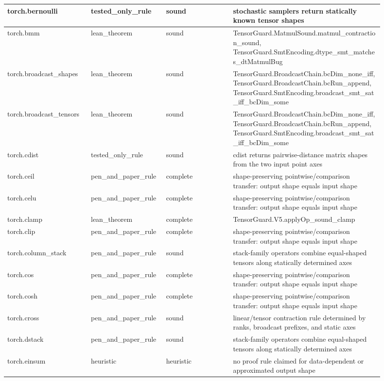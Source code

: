 \documentclass[10pt]{article}
\begin{document}
\begin{longtable}{|p{0.20\linewidth}|p{0.18\linewidth}|p{0.16\linewidth}|p{0.36\linewidth}|}
\hline
torch.bernoulli & tested\_only\_rule & sound & stochastic samplers return statically known tensor shapes \\
\hline
torch.bmm & lean\_theorem & sound & TensorGuard.MatmulSound.matmul\_contraction\_sound, TensorGuard.SmtEncoding.dtype\_smt\_matches\_dtMatmulBug \\
\hline
torch.broadcast\_shapes & lean\_theorem & sound & TensorGuard.BroadcastChain.bcDim\_none\_iff, TensorGuard.BroadcastChain.bcRun\_append, TensorGuard.SmtEncoding.broadcast\_smt\_sat\_iff\_bcDim\_some \\
\hline
torch.broadcast\_tensors & lean\_theorem & sound & TensorGuard.BroadcastChain.bcDim\_none\_iff, TensorGuard.BroadcastChain.bcRun\_append, TensorGuard.SmtEncoding.broadcast\_smt\_sat\_iff\_bcDim\_some \\
\hline
torch.cdist & tested\_only\_rule & sound & cdist returns pairwise-distance matrix shapes from the two input point axes \\
\hline
torch.ceil & pen\_and\_paper\_rule & complete & shape-preserving pointwise/comparison transfer: output shape equals input shape \\
\hline
torch.celu & pen\_and\_paper\_rule & complete & shape-preserving pointwise/comparison transfer: output shape equals input shape \\
\hline
torch.clamp & lean\_theorem & complete & TensorGuard.V5.applyOp\_sound\_clamp \\
\hline
torch.clip & pen\_and\_paper\_rule & complete & shape-preserving pointwise/comparison transfer: output shape equals input shape \\
\hline
torch.column\_stack & pen\_and\_paper\_rule & sound & stack-family operators combine equal-shaped tensors along statically determined axes \\
\hline
torch.cos & pen\_and\_paper\_rule & complete & shape-preserving pointwise/comparison transfer: output shape equals input shape \\
\hline
torch.cosh & pen\_and\_paper\_rule & complete & shape-preserving pointwise/comparison transfer: output shape equals input shape \\
\hline
torch.cross & pen\_and\_paper\_rule & sound & linear/tensor contraction rule determined by ranks, broadcast prefixes, and static axes \\
\hline
torch.dstack & pen\_and\_paper\_rule & sound & stack-family operators combine equal-shaped tensors along statically determined axes \\
\hline
torch.einsum & heuristic & heuristic & no proof rule claimed for data-dependent or approximated output shape \\

\end{longtable}
\end{document}
